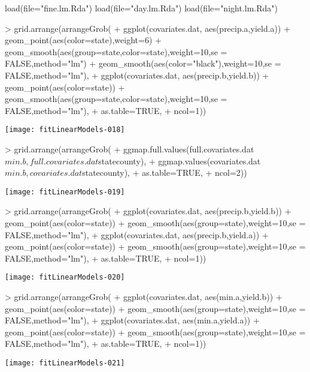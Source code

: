 \documentclass{report}
\begin{document}
load(file="fine.lm.Rda")
load(file="day.lm.Rda")
load(file="night.lm.Rda")

\begin{Schunk}
\begin{Sinput}
> grid.arrange(arrangeGrob(
+   ggplot(covariates.dat, aes(precip.a,yield.a)) + geom_point(aes(color=state),weight=6) + geom_smooth(aes(group=state,color=state),weight=10,se = FALSE,method="lm") + geom_smooth(aes(color="black"),weight=10,se = FALSE,method="lm"),
+   ggplot(covariates.dat, aes(precip.b,yield.b)) + geom_point(aes(color=state)) + geom_smooth(aes(group=state,color=state),weight=10,se = FALSE,method="lm"),
+    as.table=TRUE,
+    ncol=1))
\end{Sinput}
\end{Schunk}
\texttt{[image: fitLinearModels-018]}

\begin{Schunk}
\begin{Sinput}
> grid.arrange(arrangeGrob(
+    ggmap.full.values(full.covariates.dat$min.b,full.covariates.dat$statecounty),
+    ggmap.values(covariates.dat$min.b,covariates.dat$statecounty),
+    as.table=TRUE,
+    ncol=2))
\end{Sinput}
\end{Schunk}
\texttt{[image: fitLinearModels-019]}

\begin{Schunk}
\begin{Sinput}
> grid.arrange(arrangeGrob(
+   ggplot(covariates.dat, aes(precip.b,yield.b)) + geom_point(aes(color=state)) + geom_smooth(aes(group=state),weight=10,se = FALSE,method="lm"),
+   ggplot(covariates.dat, aes(precip.b,yield.a)) + geom_point(aes(color=state)) + geom_smooth(aes(group=state),weight=10,se = FALSE,method="lm"),
+    as.table=TRUE,
+    ncol=1))
\end{Sinput}
\end{Schunk}
\texttt{[image: fitLinearModels-020]}





\begin{Schunk}
\begin{Sinput}
> grid.arrange(arrangeGrob(
+   ggplot(covariates.dat, aes(min.a,yield.b)) + geom_point(aes(color=state)) + geom_smooth(aes(group=state),weight=10,se = FALSE,method="lm"),
+   ggplot(covariates.dat, aes(min.a,yield.a)) + geom_point(aes(color=state)) + geom_smooth(aes(group=state),weight=10,se = FALSE,method="lm"),
+    as.table=TRUE,
+    ncol=1))
\end{Sinput}
\end{Schunk}
\texttt{[image: fitLinearModels-021]}
\end{document}
